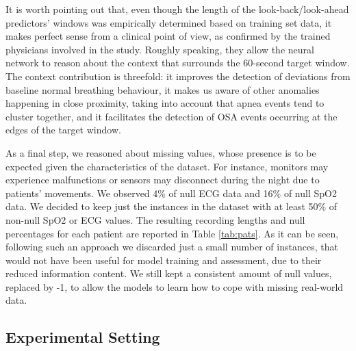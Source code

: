 \documentclass[5p,twocolumn,lefttitle]{elsarticle}
\begin{document}
It is worth pointing out that, even though the length of the look-back/look-ahead predictors' windows was empirically determined based on training set data, it makes perfect sense from a clinical point of view, as confirmed by the trained physicians involved in the study. Roughly speaking, they allow the neural network to reason about the context that surrounds the 60-second target window. The context contribution is threefold: it improves the detection of deviations from baseline normal breathing behaviour, it makes us aware of other anomalies happening in close proximity, taking into account that apnea events tend to cluster together, and it facilitates the detection of OSA events occurring at the edges of the target window.

As a final step, we reasoned about missing values, whose presence is to be expected given the 
characteristics of the dataset. For instance, monitors may experience malfunctions or sensors may disconnect during the night due to patients' movements. We observed 4\% of null ECG data and 16\% of null SpO2 data. We decided to keep just the instances in the dataset with at least 50\% of non-null SpO2 or ECG values. The resulting recording lengths and null percentages for each patient are reported in Table \ref{tab:pats}. As it can be seen, following such an approach we discarded just a small number of instances, that would not have been useful for model training and assessment, due to their reduced information content. We still kept a consistent amount of null values, replaced by \mbox{-1}, to allow the models to learn how to cope with missing real-world data. 


\subsection{Experimental Setting}
\end{document}
